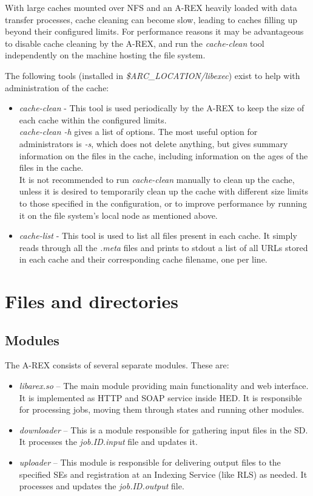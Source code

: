 \documentclass{article}                            %
\begin{document}
With large caches mounted over NFS and an A-REX heavily loaded with
data transfer processes, cache cleaning can become slow, leading to
caches filling up beyond their configured limits. For performance
reasons it may be advantageous to disable cache cleaning by the A-REX,
and run the \emph{cache-clean} tool independently on the machine
hosting the file system.

The following tools (installed in \emph{\$ARC\_LOCATION/libexec})
exist to help with administration of the cache:

\begin{itemize}
\item \emph{cache-clean} - This tool is used periodically by the A-REX to
  keep the size of each cache within the configured
  limits.\\
  \emph{cache-clean -h} gives a list of options. The most
  useful option for administrators is \emph{-s}, which does not delete
  anything, but gives summary information on the files in the cache,
  including information on the ages of the files in the cache.\\
  It is not recommended to run \emph{cache-clean} manually to clean up
  the cache, unless it is desired to temporarily clean up the cache with
  different size limits to those specified in the configuration, or to
  improve performance by running it on the file system's local node as
  mentioned above.
\item \emph{cache-list} - This tool is used to list all files present
  in each cache. It simply reads through all the \emph{.meta }files
  and prints to stdout a list of all URLs stored in each cache and
  their corresponding cache filename, one per line.
\end{itemize}


\section{Files and directories\label{sec:files and directories}}

\subsection{Modules}

The A-REX consists of several separate modules. These are:

\begin{itemize}
\item \textit{libarex.so} -- The main module providing main functionality
and web interface. It is implemented as HTTP and SOAP service inside
HED. It is responsible for processing jobs, moving them through states
and running other modules.
\item \textit{downloader} -- This is a module responsible for gathering input
files in the SD. It processes the \textit{job.ID.input} file and updates
it.
\item \textit{uploader} -- This module is responsible for delivering output
files to the specified SEs and registration at an Indexing Service
(like RLS) as needed. It processes and updates the \textit{job.ID.output}
file.
\end{itemize}
\end{document}
